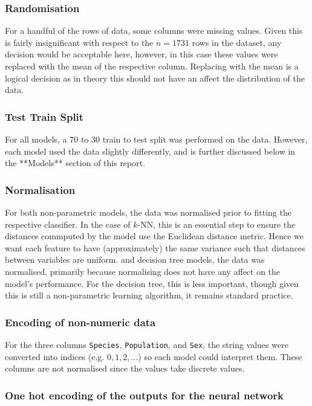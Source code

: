\documentclass{article}
\begin{document}
\subsubsection{Randomisation}

For a handful of the rows of data, some columns were missing values. Given this is fairly insignificant with respect to the $n=1731$ rows in the dataset, any decision would be acceptable here, however, in this case these values were replaced with the mean of the respective column. Replacing with the mean is a logical decision as in theory this should not have an affect the distribution of the data.

\subsubsection{Test Train Split}

For all models, a $70$ to $30$ train to test split was performed on the data. However, each model used the data slightly differently, and is further discussed below in the **Models** section of this report.

\subsubsection{Normalisation}

For both non-parametric models, the data was normalised prior to fitting the respective classifier. In the case of $k$-NN, this is an essential step to ensure the distances commputed by the model use the Euclidean distance metric. Hence we want each feature to have (approximately) the same variance such that distances between variables are uniform. and decision tree models, the data was normalised, primarily because normalising does not have any affect on the model's performance. For the decision tree, this is less important, though given this is still a non-parametric learning algorithm, it remains standard practice.

\subsubsection{Encoding of non-numeric data}

For the three columns \texttt{Species}, \texttt{Population}, and \texttt{Sex}, the string values were converted into indices (e.g. $0, 1, 2, ...$) so each model could interpret them. These columns are not normalised since the values take discrete values.

\subsubsection{One hot encoding of the outputs for the neural network}
\end{document}
